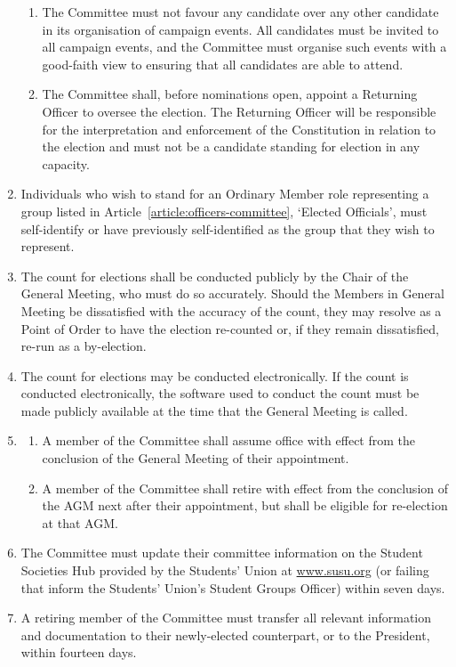 \documentclass[12pt]{constitution}
\begin{document}
\begin{enumerate}
\begin{enumerate}
        \item The Committee must not favour any candidate over any other candidate in its organisation of campaign events. All candidates must be invited to all campaign events, and the Committee must organise such events with a good-faith view to ensuring that all candidates are able to attend.
        \item The Committee shall, before nominations open, appoint a Returning Officer to oversee the election. The Returning Officer will be responsible for the interpretation and enforcement of the Constitution in relation to the election and must not be a candidate standing for election in any capacity.
    \end{enumerate}
    
    \item Individuals who wish to stand for an Ordinary Member role representing a group listed in Article~\ref{article:officers-committee}, `Elected Officials', must self-identify or have previously self-identified as the group that they wish to represent.

    \item The count for elections shall be conducted publicly by the Chair of the General Meeting, who must do so accurately. Should the Members in General Meeting be dissatisfied with the accuracy of the count, they may resolve as a Point of Order to have the election re-counted or, if they remain dissatisfied, re-run as a by-election.
    
    \item The count for elections may be conducted electronically. If the count is conducted electronically, the software used to conduct the count must be made publicly available at the time that the General Meeting is called.

    \item \begin{enumerate}
        \item A member of the Committee shall assume office with effect from the conclusion of the General Meeting of their appointment.
        \item A member of the Committee shall retire with effect from the conclusion of the AGM next after their appointment, but shall be eligible for re-election at that AGM.
    \end{enumerate}

    \item The Committee must update their committee information on the Student Societies Hub provided by the Students' Union at \url{www.susu.org} (or failing that inform the Students' Union's Student Groups Officer) within seven days.
    
    \item A retiring member of the Committee must transfer all relevant information and documentation to their newly-elected counterpart, or to the President, within fourteen days.
\end{enumerate}
\end{document}
